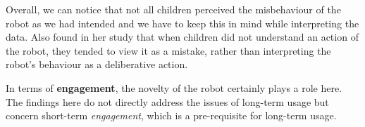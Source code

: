 \documentclass{sig-alternate}
\newcommand{\eg}{{\textit{e.g.~}}}
\begin{document}
Overall, we can notice that not all children perceived the misbehaviour of the
robot as we had intended and we have to keep this in mind while interpreting the
data. Also \cite{leite_long-term_2013} found in her study that when children did
not understand an action of the robot, they tended to view it as a mistake,
rather than interpreting the robot's behaviour as a deliberative action.







In terms of \textbf{engagement}, the novelty of the robot certainly plays a role
here. The findings here do not directly address the issues
of long-term usage but concern short-term \textit{engagement}, which is a
pre-requisite for long-term usage.
\end{document}
